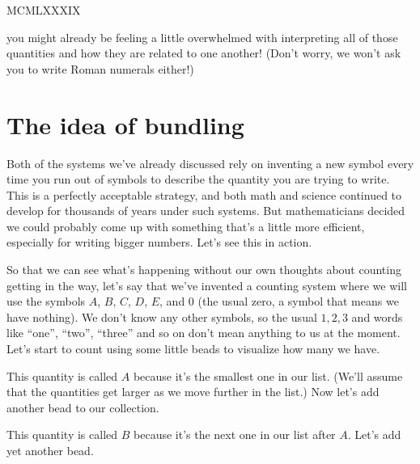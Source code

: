 \documentclass{ximera}
\begin{document}
\begin{center}
MCMLXXXIX
\end{center}

you might already be feeling a little overwhelmed with interpreting all of those quantities and how they are related to one another! (Don't worry, we won't ask you to write Roman numerals either!)

\section{The idea of bundling}

Both of the systems we've already discussed rely on inventing a new symbol every time you run out of symbols to describe the quantity you are trying to write. This is a perfectly acceptable strategy, and both math and science continued to develop for thousands of years under such systems. But mathematicians decided we could probably come up with something that's a little more efficient, especially for writing bigger numbers. Let's see this in action.

So that we can see what's happening without our own thoughts about counting getting in the way, let's say that we've invented a counting system where we will use the symbols $A$, $B$, $C$, $D$, $E$, and $0$ (the usual zero, a symbol that means we have nothing). We don't know any other symbols, so the usual $1, 2, 3$ and words like ``one'', ``two'', ``three'' and so on don't mean anything to us at the moment. Let's start to count using some little beads to visualize how many we have.

\begin{center}
\end{center}
This quantity is called $A$ because it's the smallest one in our list. (We'll assume that the quantities get larger as we move further in the list.) Now let's add another bead to our collection.

\begin{center}
\end{center}
This quantity is called $B$ because it's the next one in our list after $A$. Let's add yet another bead.
\end{document}

